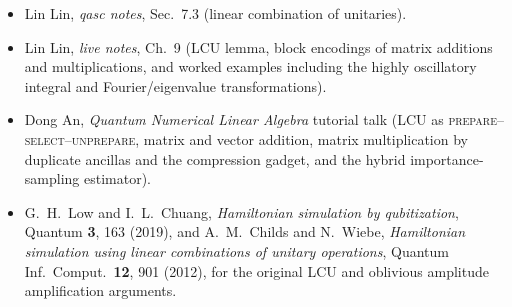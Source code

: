 \readingsection
\begin{itemize}[leftmargin=1.4em]
  \item Lin Lin, \emph{qasc notes}, Sec.~7.3 (linear combination of unitaries).
  \item Lin Lin, \emph{live notes}, Ch.~9 (LCU lemma, block encodings of matrix
        additions and multiplications, and worked examples including the highly
        oscillatory integral and Fourier/eigenvalue transformations).
  \item Dong An, \emph{Quantum Numerical Linear Algebra} tutorial talk (LCU as
        \textsc{prepare}--\textsc{select}--\textsc{unprepare}, matrix and vector
        addition, matrix multiplication by duplicate ancillas and the compression
        gadget, and the hybrid importance-sampling estimator).
  \item G.~H.~Low and I.~L.~Chuang, \emph{Hamiltonian simulation by qubitization},
        Quantum \textbf{3}, 163 (2019), and A.~M.~Childs and N.~Wiebe,
        \emph{Hamiltonian simulation using linear combinations of unitary
        operations}, Quantum Inf.\ Comput.\ \textbf{12}, 901 (2012), for the original
        LCU and oblivious amplitude amplification arguments.
\end{itemize}
